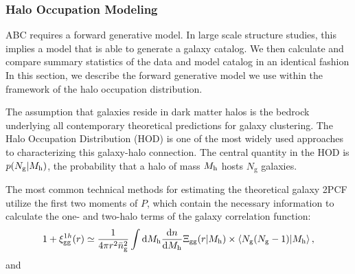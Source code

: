 \documentclass[fleqn,usenatbib]{mnras}
\begin{document}
\subsubsection{Halo Occupation Modeling}

\newcommand{\lcdm}{\Lambda {\rm CDM}}
\newcommand{\dd}{\mathrm{d}}
\newcommand{\mean}[2]{\left\langle#1 \vert {#2}\right\rangle}

\newcommand{\ngal}{N_{\mathrm{g}}}
\newcommand{\nsat}{N_\mathrm{s}}
\newcommand{\ncen}{N_\mathrm{c}}
\newcommand{\pnm}[2]{p(#1|#2)}

\newcommand{\mhalo}{M_{\rm h}}
\newcommand{\mvir}{M_\mathrm{vir}} 

\newcommand{\dndmvir}{\frac{\dd n}{\dd\mvir}}
\newcommand{\dndmhalo}{\frac{\dd n}{\dd\mhalo}}
\newcommand{\dndmvirprime}{\frac{\dd n}{\dd\mvir'}}

\newcommand{\xigg}{\xi_{\mathrm{gg}}}
\newcommand{\xihh}{\xi_{\mathrm{hh}}}
\newcommand{\xiggr}{\xi_{\mathrm{gg}}(r)}
\newcommand{\xiggroneh}{\xi^{1h}_{\mathrm{gg}}(r)}
\newcommand{\xiggrtwoh}{\xi^{2h}_{\mathrm{gg}}(r)}
\newcommand{\ngalaxy}{\bar{n}_{\mathrm{g}}}
\newcommand{\gmf}{\mathcal{\zeta}_{\rm g}}

ABC requires a forward generative model. In large scale structure studies, this implies a model
that is able to generate a galaxy catalog. We then calculate and compare summary statistics of the data and model catalog in an identical fashion
In this section, we describe the forward generative model we use within the framework of the 
halo occupation distribution.

The assumption that galaxies reside in dark matter halos is the bedrock underlying 
all contemporary theoretical predictions for galaxy clustering. The Halo Occupation Distribution 
(HOD) is one of the most widely used approaches to characterizing this galaxy-halo connection. 
The central quantity in the HOD is $\pnm{\ngal}{\mhalo}$, the probability that a halo of mass 
$\mhalo$ hosts $\ngal$ galaxies. 

The most common technical methods for estimating the theoretical galaxy 2PCF utilize the 
first two moments of $P$, which contain the necessary information to calculate the one- 
and two-halo terms of the galaxy correlation function:
\begin{eqnarray}
\label{eq:onehaloterm}
1+\xiggroneh \simeq \frac{1}{4\pi{}r^{2}\ngalaxy^{2}}\int\dd\mhalo\dndmhalo\Xi_{\rm gg}(r|\mhalo) \times \mean{\ngal(\ngal-1)}{\mhalo},
\end{eqnarray} and
\end{document}
